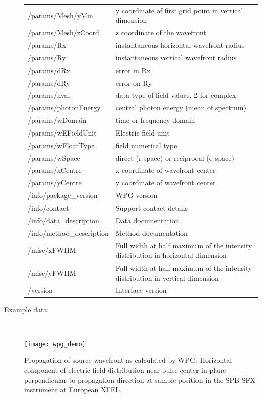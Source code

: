 \documentclass[12pt]{scrartcl}
\begin{document}
\begin{description}
{\begin{tabular}{l|l}
  /params/Mesh/yMin     & y coordinate of first grid point in vertical dimension \\
  /params/Mesh/zCoord     & z coordinate of the wavefront \\
  /params/Rx    &  instantaneous horizontal wavefront radius\\
  /params/Ry    &  instantaneous vertical wavefront radius\\
  /params/dRx     & error in Rx \\
  /params/dRy     & error on Ry \\
  /params/nval    &  data type of field values, 2 for complex \\
  /params/photonEnergy    & central photon energy (mean of spectrum) \\
  /params/wDomain     & time or frequency domain\\
  /params/wEFieldUnit     & Electric field unit \\
  /params/wFloatType    &  field numerical type \\
  /params/wSpace    &  direct (r-space) or reciprocal (q-space)\\
  /params/xCentre     & x coordinate of wavefront center \\
  /params/yCentre                 & y coordinate of wavefront center \\
  /info/package\_version          & WPG version \\
  /info/contact        & Support contact details \\
  /info/data\_description         & Data documentation \\
  /info/method\_description       & Method documentation \\
  /misc/xFWHM        & Full width at half maximum of the intensity distribution in horizontal dimension\\
  /misc/yFWHM        & Full width at half maximum of the intensity distribution in
  vertical dimension\\
  /version        & Interface version \\
  \hline
  \hline
\end{tabular}
}
\item[Example data:]\ \\
      \begin{center}
        \texttt{[image: wpg\_demo]}
      \end{center}
      \scriptsize{Propagation of source wavefront as calculated by WPG: Horizontal
      component of electric field distribution near pulse center in plane perpendicular to
    propagation direction at sample position in the SPB-SFX instrument at
    European XFEL.}
\end{description}
\end{document}
